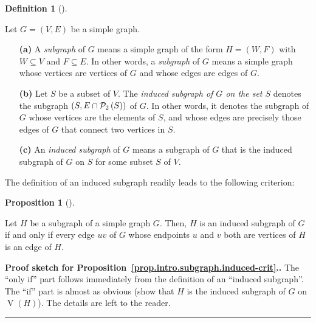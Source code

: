 \documentclass[numbers=enddot,12pt,final,onecolumn,notitlepage]{scrartcl}%
\theoremstyle{definition}
\newtheorem{prop}[theo]{Proposition}
\newenvironment{proposition}[1][]
{\begin{prop}[#1]\begin{leftbar}}
{\end{leftbar}\end{prop}}
\newtheorem{defi}[theo]{Definition}
\newenvironment{definition}[1][]
{\begin{defi}[#1]\begin{leftbar}}
{\end{leftbar}\end{defi}}
\newenvironment{proof}[1][Proof]{\noindent\textbf{#1.} }{\ \rule{0.5em}{0.5em}}
\newcommand{\powset}[2][]{\ifthenelse{\equal{#2}{}}{\mathcal{P}\left(#1\right)}{\mathcal{P}_{#1}\left(#2\right)}}
\newcommand{\tup}[1]{\left( #1 \right)}
\newcommand{\verts}[1]{\operatorname{V}\left( #1 \right)}
\begin{document}
\begin{definition} \label{def.intro.subgraph}
Let $G = \tup{V, E}$ be a simple graph.

\begin{enumerate}

\item[\textbf{(a)}] A \textit{subgraph} of $G$ means a simple graph
of the form $H = \tup{W, F}$ with $W \subseteq V$ and
$F \subseteq E$.
In other words, a \textit{subgraph} of $G$ means a simple graph whose
vertices are vertices of $G$ and whose edges are edges of $G$.

\item[\textbf{(b)}] Let $S$ be a subset of $V$. The
\textit{induced subgraph of $G$ on the set $S$} denotes the subgraph
$\tup{S, E \cap \powset[2]{S}}$ of $G$. In other words, it denotes
the subgraph of $G$ whose vertices are the elements of $S$, and whose
edges are precisely those edges of $G$ that connect two vertices in
$S$.

\item[\textbf{(c)}] An \textit{induced subgraph} of $G$ means a
subgraph of $G$ that is the induced subgraph of $G$ on $S$ for some
subset $S$ of $V$.

\end{enumerate}

\end{definition}

The definition of an induced subgraph readily leads to the following
criterion:

\begin{proposition} \label{prop.intro.subgraph.induced-crit}
Let $H$ be a subgraph of a simple graph $G$. Then, $H$ is an induced
subgraph of $G$ if and only if every edge $uv$ of $G$ whose endpoints
$u$ and $v$ both are vertices of $H$ is an edge of $H$.
\end{proposition}

\begin{proof}[Proof sketch for
Proposition~\ref{prop.intro.subgraph.induced-crit}.]
The ``only if'' part follows immediately from the definition of an
``induced subgraph''. The ``if'' part is almost as obvious (show that
$H$ is the induced subgraph of $G$ on $\verts{H}$). The details are
left to the reader.
\end{proof}
\end{document}
